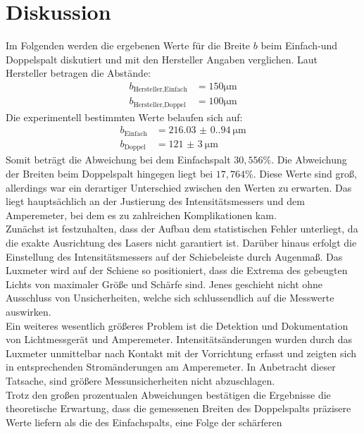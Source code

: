 \section{Diskussion}
\label{sec:Diskussion}

Im Folgenden werden die ergebenen Werte für die Breite $b$ beim Einfach-und 
Doppelspalt diskutiert und mit den Hersteller Angaben verglichen. Laut Hersteller
betragen die Abstände:
\begin{align*}
    b_\text{Hersteller,Einfach} &= 150 \unit{\micro\meter} \\
    b_\text{Hersteller,Doppel}  &= 100 \unit{\micro\meter}
\end{align*}
\noindent Die experimentell bestimmten Werte belaufen sich auf:
\begin{align*}
    b_\text{Einfach} &= \qty{216.03(0.94)}{\micro\meter} \\
    b_\text{Doppel}  &= \qty{121(3)}{\micro\meter}
\end{align*}
\noindent Somit beträgt die Abweichung bei dem Einfachspalt $30,556 \%$. Die 
Abweichung der Breiten beim Doppelspalt hingegen liegt bei $17,764 \%$. Diese 
Werte sind groß, allerdings war ein derartiger Unterschied zwischen den Werten 
zu erwarten. Das liegt hauptsächlich an der Justierung des Intensitätsmessers 
und dem Amperemeter, bei dem es zu zahlreichen Komplikationen kam.
\\
\noindent Zunächst ist
festzuhalten, dass der Aufbau dem statistischen Fehler unterliegt, da die
exakte Ausrichtung des Lasers nicht garantiert ist. Darüber hinaus erfolgt 
die Einstellung des Intensitätsmessers auf der Schiebeleiste durch Augenmaß. 
Das Luxmeter wird auf der Schiene so positioniert, dass die Extrema des 
gebeugten Lichts von maximaler Größe und Schärfe sind. Jenes geschieht nicht 
ohne Ausschluss von Unsicherheiten, welche sich schlussendlich auf die 
Messwerte auswirken.
\\
\noindent Ein weiteres wesentlich größeres Problem ist die Detektion und 
Dokumentation von Lichtmessgerät und Amperemeter. Intensitätsänderungen
wurden durch das Luxmeter unmittelbar nach Kontakt mit der Vorrichtung
erfasst und zeigten sich in entsprechenden Stromänderungen am Amperemeter.
In Anbetracht dieser Tatsache, sind größere Messunsicherheiten nicht abzuschlagen.
\\
\noindent Trotz den großen prozentualen Abweichungen bestätigen die Ergebnisse
die theoretische Erwartung, dass die gemessenen Breiten des Doppelspalts präzisere
Werte liefern als die des Einfachspalts, eine Folge der schärferen 
